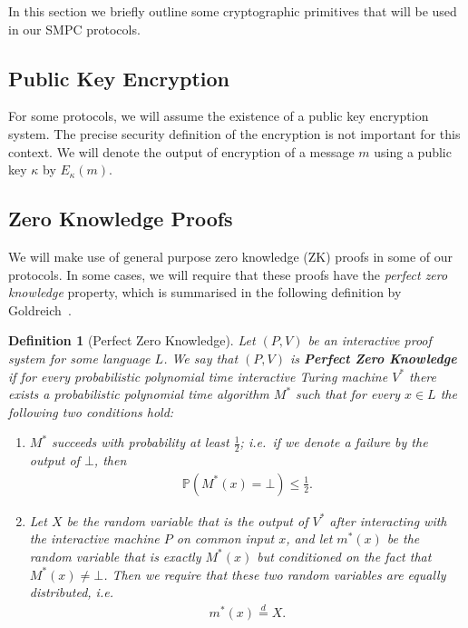 \documentclass{article}
\newcommand{\eqd}[0]{\stackrel{d}{=}}
\newtheorem{definition}{Definition}
\theoremstyle{remark}
\renewcommand{\P}{\mathbb{P}}
\begin{document}
In this section we briefly outline some cryptographic primitives that will be
used in our SMPC protocols.

\subsection{Public Key Encryption}

\newcommand{\encrypt}[2]{E_{#1}\left(#2\right)}

For some protocols, we will assume the existence of a public key encryption
system. The precise security definition of the encryption is not important for
this context. We will denote the output of encryption of a message $m$ using a
public key $\kappa$ by $\encrypt{\kappa}{m}$.

\subsection{Zero Knowledge Proofs}

We will make use of general purpose zero knowledge (ZK) proofs in some of our
protocols. In some cases, we will require that these proofs have the
\textit{perfect zero knowledge} property, which is summarised in the following
definition by Goldreich~\cite{goldreich_2001}.

\begin{definition}[Perfect Zero Knowledge]
	Let $(P, V)$ be an interactive proof system for some language $L$. We say
	that $(P, V)$ is \textbf{Perfect Zero Knowledge} if for every probabilistic
	polynomial time interactive Turing machine $V^\ast$ there exists a
	probabilistic polynomial time algorithm $M^\ast$ such that for every $x \in
	L$ the following two conditions hold:

	\begin{enumerate}
		\item $M^\ast$ succeeds with probability at least $\frac{1}{2}$; i.e.\
			if we denote a failure by the output of $\bot$, then
			\begin{align*}
				\P(M^\ast(x) = \bot) \le \frac{1}{2}.
			\end{align*}

		\item Let $X$ be the random variable that is the output of $V^\ast$
			after interacting with the interactive machine $P$ on common input
			$x$, and let $m^\ast(x)$ be the random variable that is exactly
			$M^\ast(x)$ but conditioned on the fact that $M^\ast(x) \ne \bot$.
			Then we require that these two random variables are equally
			distributed, i.e.
			\begin{align*}
				m^\ast(x) \eqd X.
			\end{align*}
	\end{enumerate}
\end{definition}
\end{document}
